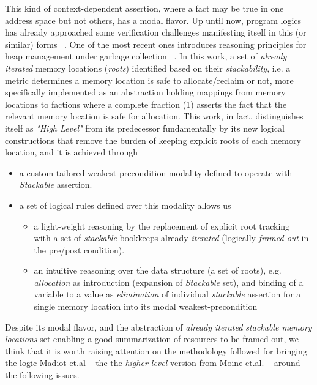 This kind of context-dependent assertion, where a fact may be true in one address space but not others, has a modal flavor. Up until now, program logics ~\cite{} has already approached some verification challenges manifesting itself in this (or similar) forms ~\cite{}. One of the most recent ones introduces reasoning principles for heap management under garbage collection ~\cite{}. In this work, a set of \textit{already iterated} memory locations (\textit{roots}) identified based on their \textit{stackability}, i.e. a metric determines a memory location is safe to allocate/reclaim or not, more specifically implemented as an abstraction holding mappings from memory locations to factions where a complete fraction (1) asserts the fact that the relevant memory location is safe for allocation. This work, in fact, distinguishes itself as \textit{"High Level"} from its predecessor fundamentally by its new logical constructions that remove the burden of keeping explicit roots of each memory location, and it is achieved through ~\cite{}
\begin{itemize}
\item a custom-tailored weakest-precondition modality defined to operate with \textit{Stackable} assertion.
\item a set of logical rules defined over this modality allows us
  \begin{itemize}
  \item  a light-weight reasoning by the replacement of explicit root tracking ~\cite{} with a set of \textit{stackable} bookkeeps already \textit{iterated} (logically \textit{framed-out} in the pre/post condition). 
  \item  an intuitive reasoning over the data structure (a set of roots), e.g. \textit{allocation} as introduction (expansion of \textit{Stackable} set), and binding of a variable to a value as \textit{elimination} of individual \textit{stackable} assertion for a single memory location into its modal weakest-precondition
  \end{itemize}
\end{itemize}
Despite its modal flavor, and the abstraction of \textit{already iterated stackable memory locations} set enabling a good summarization of resources to be framed out, we think that it is worth raising attention on the methodology followed for bringing the logic Madiot et.al ~\cite{} the the \textit{higher-level} version from Moine et.al. ~\cite{} around the following issues.
\begin{remark} 
\end{remark}
\begin{remark}
\end{remark}
\begin{remark}
\end{remark}

